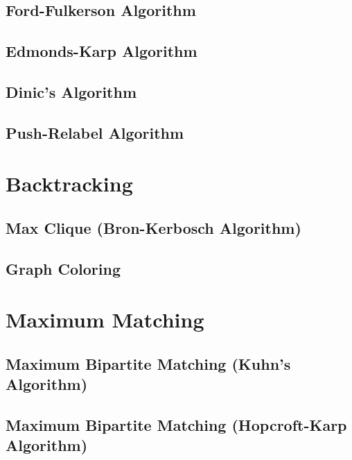 \subsection{Ford-Fulkerson Algorithm}

\subsection{Edmonds-Karp Algorithm}

\subsection{Dinic's Algorithm}

\subsection{Push-Relabel Algorithm}


\section{Backtracking}
\setcounter{section}{6}
\setcounter{subsection}{0}
\subsection{Max Clique (Bron-Kerbosch Algorithm)}

\subsection{Graph Coloring}


\section{Maximum Matching}
\setcounter{section}{7}
\setcounter{subsection}{0}
\subsection{Maximum Bipartite Matching (Kuhn's Algorithm)}

\subsection{Maximum Bipartite Matching (Hopcroft-Karp Algorithm)}

